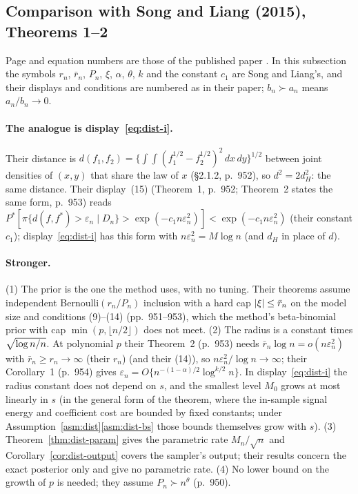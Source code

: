 
\subsection{Comparison with Song and Liang (2015), Theorems 1--2}\label{sec:SL-dist}

Page and equation numbers are those of the published paper \citep{SongLiang2015}. In this subsection the symbols $r_n$,
$\bar r_n$, $P_n$, $\xi$, $\alpha$, $\theta$, $k$ and the constant $c_1$ are Song and Liang's, and their displays and
conditions are numbered as in their paper; $b_n\succ a_n$ means $a_n/b_n\to0$.

\paragraph{The analogue is display~\eqref{eq:dist-i}.} Their distance is
$d(f_1,f_2)=\{\int\!\!\int(f_1^{1/2}-f_2^{1/2})^2\,dx\,dy\}^{1/2}$ between joint densities of $(x,y)$ that share the law of
$x$ (\S2.1.2, p.~952), so $d^2=2d_H^2$: the same distance. Their display~(15) (Theorem~1, p.~952; Theorem~2 states the
same form, p.~953) reads $P^*[\pi\{d(f,f^*)>\varepsilon_n\mid D_n\}>\exp(-c_1n\varepsilon_n^2)]<\exp(-c_1n\varepsilon_n^2)$
(their constant $c_1$); display~\eqref{eq:dist-i} has this form with $n\varepsilon_n^2=M\log n$ (and $d_H$ in place of
$d$).

\paragraph{Stronger.} (1) The prior is the one the method uses, with no tuning. Their theorems assume independent
Bernoulli$(r_n/P_n)$ inclusion with a hard cap $\lvert \xi\rvert\le\bar r_n$ on the model size and conditions (9)--(14)
(pp.~951--953), which the method's beta-binomial prior with cap $\min(p,\lfloor n/2\rfloor)$ does not meet. (2) The radius
is a constant times $\sqrt{\log n/n}$. At polynomial $p$ their Theorem~2 (p.~953) needs $\bar r_n\log n=o(n\varepsilon_n^2)$ with
$\bar r_n\ge r_n\to\infty$ (their $r_n$) (and their (14)), so $n\varepsilon_n^2/\log n\to\infty$; their Corollary~1 (p.~954) gives
$\varepsilon_n=O\{n^{-(1-\alpha)/2}\log^{k/2}n\}$. In display~\eqref{eq:dist-i} the radius constant does not depend on $s$,
and the smallest level $M_0$ grows at most linearly in $s$ (in the general form of the theorem, where the in-sample
signal energy and coefficient cost are bounded by fixed constants; under Assumption~\ref{asm:dist}\ref{asm:dist-bs} those bounds themselves grow
with $s$). (3) Theorem~\ref{thm:dist-param} gives the parametric rate $M_n/\sqrt n$ and Corollary~\ref{cor:dist-output}
covers the sampler's output; their results concern the exact posterior only and give no parametric rate. (4) No lower
bound on the growth of $p$ is needed; they assume $P_n\succ n^\theta$ (p.~950).

